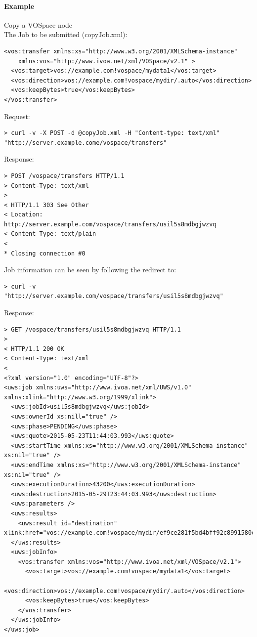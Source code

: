 \documentclass[11pt,a4paper]{ivoa}
\begin{document}
\paragraph{Example}
Copy a VOSpace node
\\[5px]
\noindent
The Job to be submitted (copyJob.xml):
\begin{lstlisting}
<vos:transfer xmlns:xs="http://www.w3.org/2001/XMLSchema-instance"
    xmlns:vos="http://www.ivoa.net/xml/VOSpace/v2.1" >
  <vos:target>vos://example.com!vospace/mydata1</vos:target>
  <vos:direction>vos://example.com!vospace/mydir/.auto</vos:direction>
  <vos:keepBytes>true</vos:keepBytes>
</vos:transfer>
\end{lstlisting}
Request:
\begin{lstlisting}
> curl -v -X POST -d @copyJob.xml -H "Content-type: text/xml" "http://server.example.come/vospace/transfers"
\end{lstlisting}
Response:
\begin{lstlisting}
> POST /vospace/transfers HTTP/1.1
> Content-Type: text/xml
>
< HTTP/1.1 303 See Other
< Location: http://server.example.com/vospace/transfers/usil5s8mdbgjwzvq
< Content-Type: text/plain
<
* Closing connection #0
\end{lstlisting}
Job information can be seen by following the redirect to:
\begin{lstlisting}
> curl -v "http://server.example.com/vospace/transfers/usil5s8mdbgjwzvq"
\end{lstlisting}
Response:
\begin{lstlisting}
> GET /vospace/transfers/usil5s8mdbgjwzvq HTTP/1.1
>
< HTTP/1.1 200 OK
< Content-Type: text/xml
<
<?xml version="1.0" encoding="UTF-8"?>
<uws:job xmlns:uws="http://www.ivoa.net/xml/UWS/v1.0" xmlns:xlink="http://www.w3.org/1999/xlink">
  <uws:jobId>usil5s8mdbgjwzvq</uws:jobId>
  <uws:ownerId xs:nill="true" />
  <uws:phase>PENDING</uws:phase>
  <uws:quote>2015-05-23T11:44:03.993</uws:quote>
  <uws:startTime xmlns:xs="http://www.w3.org/2001/XMLSchema-instance" xs:nil="true" />
  <uws:endTime xmlns:xs="http://www.w3.org/2001/XMLSchema-instance" xs:nil="true" />
  <uws:executionDuration>43200</uws:executionDuration>
  <uws:destruction>2015-05-29T23:44:03.993</uws:destruction>
  <uws:parameters />
  <uws:results>
    <uws:result id="destination" xlink:href="vos://example.com!vospace/mydir/ef9ce281f5bd4bff92c8991580cddff4"/>
  </uws:results>
  <uws:jobInfo>
    <vos:transfer xmlns:vos="http://www.ivoa.net/xml/VOSpace/v2.1">
      <vos:target>vos://example.com!vospace/mydata1</vos:target>
      <vos:direction>vos://example.com!vospace/mydir/.auto</vos:direction>
      <vos:keepBytes>true</vos:keepBytes>
    </vos:transfer>
  </uws:jobInfo>
</uws:job>
\end{lstlisting}
\end{document}
